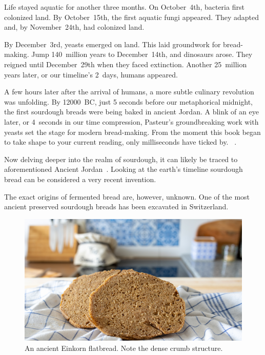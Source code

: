 Life stayed aquatic for another three months.
On October~4th, bacteria first colonized land. By October~15th, the
first aquatic fungi appeared. They adapted and, by November~24th, had colonized
land.

By December~3rd, yeasts emerged on land. This laid groundwork for bread-making.
Jump 140~million years to December~14th, and dinosaurs arose. They reigned
until December~29th when they faced extinction. Another 25~million
years later, or our timeline's 2~days, humans appeared.

A few hours later after the arrival of humans, a more subtle culinary
revolution was unfolding. By  \num{12000}~BC, just 5 seconds before our metaphorical
midnight, the first sourdough breads were being baked in ancient Jordan. A blink of
an eye later, or 4~seconds in our time compression, Pasteur's groundbreaking work
with yeasts set the stage for modern bread-making. From the moment this book
began to take shape to your current reading, only milliseconds have ticked by.
~\cite{Yong_2017}.

Now delving deeper into the realm of sourdough, it can likely be traced to aforementioned
Ancient Jordan~\cite{jordan+bread}. Looking at the earth's timeline sourdough
bread can be considered a very recent invention.

The exact origins of fermented
bread are, however, unknown. One of the most ancient preserved
sourdough breads has been excavated in Switzerland.~\cite{switzerland+bread}

\begin{figure}[ht]
  \includegraphics[width=\textwidth]{einkorn-crumb}
  \caption[Ancient Einkorn flatbread]{An ancient Einkorn flatbread. Note the
      dense crumb structure.}%
  \label{einkorn-crumb}
\end{figure}

